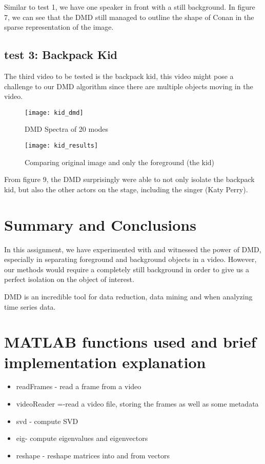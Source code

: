 \documentclass[12pt, a4paper]{article}
\begin{document}
Similar to test 1, we have one speaker in front with a still background. In figure 7, we can see that the DMD still managed to outline the shape of Conan in the sparse representation of the image.

\subsection{test 3: Backpack Kid}
The third video to be tested is the backpack kid, this video might pose a challenge to our DMD algorithm since there are multiple objects moving in the video.

\begin{figure}[H]
\centering
\texttt{[image: kid\_dmd]}
\caption{DMD Spectra of 20 modes}
\end{figure}
\begin{figure}[H]
\texttt{[image: kid\_results]}
\caption{Comparing original image and only the foreground (the kid)}
\end{figure}

From figure 9, the DMD surprisingly were able to not only isolate the backpack kid, but also the other actors on the stage, including the singer (Katy Perry).

\section{Summary and Conclusions}
In this assignment, we have experimented with and witnessed the power of DMD, especially in separating foreground and background objects in a video. However, our methods would require a completely still background in order to give us a perfect isolation on the object of interest.

DMD is an incredible tool for data reduction, data mining and when analyzing time series data.
\newpage
\appendix
\section{MATLAB functions used and brief implementation explanation}
\begin{itemize}
\item readFrames - read a frame from a video
\item videoReader =-read a video file, storing the frames as well as some metadata
\item svd - compute SVD
\item eig- compute eigenvalues and eigenvectors
\item reshape - reshape matrices into and from vectors
\end{itemize}
\end{document}
